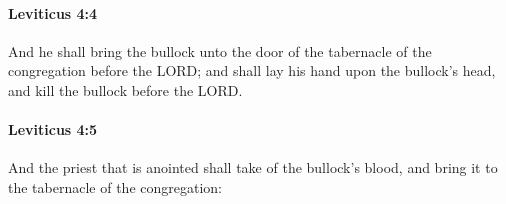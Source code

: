 		\paragraph{Leviticus 4:4} %
			\label{LEVITICUS-4-4}

			And he shall bring the bullock unto the door of the tabernacle of the congregation before the LORD; and shall lay his hand upon the bullock’s head, and kill the bullock before the LORD.


		\paragraph{Leviticus 4:5} %
			\label{LEVITICUS-4-5}

			And the priest that is anointed shall take of the bullock’s blood, and bring it to the tabernacle of the congregation:


